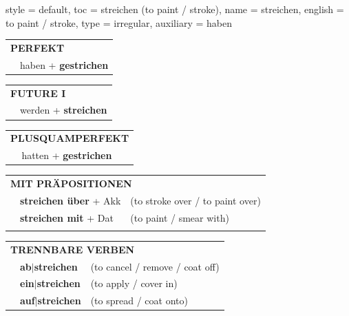 \begin{verbentry}{
  style = {default},
  toc = {streichen (to paint / stroke)},
  name = {streichen},
  english = {to paint / stroke},
  type = {irregular},
  auxiliary = {haben}
}
 \begin{tabular}{rl}
     \multicolumn{2}{l}{\textbf{PERFEKT}}\\
   & haben + \textbf{gestrichen}\\
  \end{tabular}
\hfill
\begin{tabular}{rl}
    \multicolumn{2}{l}{\textbf{FUTURE I}}\\
   & werden + \textbf{streichen}\\
  \end{tabular}
\hfill
\begin{tabular}{rl}
    \multicolumn{2}{l}{\textbf{PLUSQUAMPERFEKT}}\\
   & hatten + \textbf{gestrichen}\\
  \end{tabular}

 \vspace{10pt}

\begin{tabular}{lll}
      \multicolumn{3}{l}{\textbf{MIT PRÄPOSITIONEN}}\\
& \textbf{streichen über} + Akk & (to stroke over / to paint over)\\
& \textbf{streichen mit} + Dat & (to paint / smear with)\\
\vspace{10pt}
\end{tabular}
  \hfill
\begin{tabular}{lll}
      \multicolumn{3}{l}{\textbf{TRENNBARE VERBEN}}\\
 & \textbf{ab$|$streichen} & (to cancel / remove / coat off)\\
 & \textbf{ein$|$streichen} & (to apply / cover in)\\
 & \textbf{auf$|$streichen} & (to spread / coat onto)\\
  \end{tabular}


\vspace{-5pt}
\end{verbentry}

